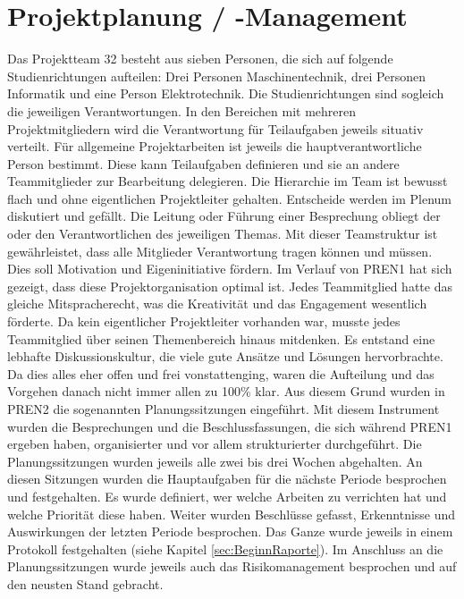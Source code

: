 \section{Projektplanung / -Management}

Das Projektteam 32 besteht aus sieben Personen, die sich auf folgende 
Studienrichtungen aufteilen: Drei Personen Maschinentechnik, drei 
Personen Informatik und eine Person Elektrotechnik. Die Studienrichtungen 
sind sogleich die jeweiligen Verantwortungen. In den Bereichen mit mehreren 
Projektmitgliedern wird die Verantwortung für Teilaufgaben jeweils 
situativ verteilt. Für allgemeine Projektarbeiten ist jeweils die 
hauptverantwortliche Person bestimmt. Diese kann Teilaufgaben definieren 
und sie an andere Teammitglieder zur Bearbeitung delegieren. Die Hierarchie 
im Team ist bewusst flach und ohne eigentlichen Projektleiter gehalten. 
Entscheide werden im Plenum diskutiert und gefällt. Die Leitung oder Führung 
einer Besprechung obliegt der oder den Verantwortlichen des jeweiligen Themas. 
Mit dieser Teamstruktur ist gewährleistet, dass alle Mitglieder Verantwortung 
tragen können und müssen. Dies soll Motivation und Eigeninitiative fördern. 
Im Verlauf von PREN1 hat sich gezeigt, dass diese Projektorganisation optimal 
ist. Jedes Teammitglied hatte das gleiche Mitspracherecht, was die Kreativität 
und das Engagement wesentlich förderte. Da kein eigentlicher Projektleiter 
vorhanden war, musste jedes Teammitglied über seinen Themenbereich hinaus 
mitdenken. Es entstand eine lebhafte Diskussionskultur, die viele gute Ansätze 
und Lösungen hervorbrachte. Da dies alles eher offen und frei vonstattenging, 
waren die Aufteilung und das Vorgehen danach nicht immer allen zu 100\% klar. 
Aus diesem Grund wurden in PREN2 die sogenannten Planungssitzungen eingeführt. 
Mit diesem Instrument wurden die Besprechungen und die Beschlussfassungen, die 
sich während PREN1 ergeben haben, organisierter und vor allem strukturierter durchgeführt.
Die Planungssitzungen wurden jeweils alle zwei bis drei Wochen abgehalten. An diesen 
Sitzungen wurden die Hauptaufgaben für die nächste Periode besprochen und 
festgehalten. Es wurde definiert, wer welche Arbeiten zu verrichten hat und welche 
Priorität diese haben. Weiter wurden Beschlüsse gefasst, Erkenntnisse und 
Auswirkungen der letzten Periode besprochen. Das Ganze wurde jeweils in einem 
Protokoll festgehalten (siehe Kapitel \ref{sec:BeginnRaporte}). Im Anschluss an 
die Planungssitzungen wurde jeweils auch das Risikomanagement besprochen und auf den 
neusten Stand gebracht. 
\newline
